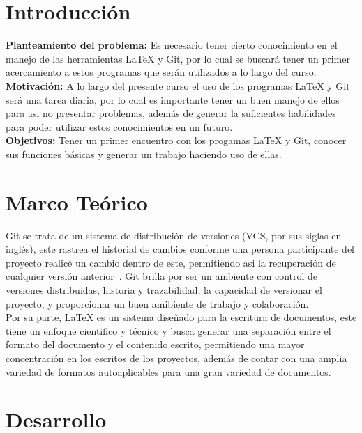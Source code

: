 \documentclass[letterpaper,12pt,oneside]{article}
\begin{document}
\tableofcontents
\clearpage
    

\section{Introducción} 

    \textbf{Planteamiento del problema:} Es necesario tener cierto conocimiento en el manejo de las herramientas LaTeX y Git, por lo cual se buscará tener un primer acercamiento a estos programas que serán utilizados a lo largo del curso.\\
    
    \textbf{Motivación:} A lo largo del presente curso el uso de los programas LaTeX y Git será una tarea diaria, por lo cual es importante tener un buen manejo de ellos para asi no presentar problemas, además de generar la suficientes habilidades para poder utilizar estos conocimientos en un futuro. \\
    
    \textbf{Objetivos:} Tener un primer encuentro con los progamas LaTeX y Git, conocer sus funciones básicas y generar un trabajo haciendo uso de ellas. 

\section{Marco Teórico}

Git se trata de un sistema de distribución de versiones (VCS, por sus siglas en inglés), este rastrea el historial de cambios conforme una persona participante del proyecto realicé un cambio dentro de este, permitiendo asi la recuperación de cualquier versión anterior~\cite{git}. Git brilla por ser un ambiente con control de versiones distribuidas, historia y trazabilidad, la capacidad de versionar el proyecto, y proporcionar un buen amibiente de trabajo y colaboración.\\

Por su parte, LaTeX es un sistema diseñado para la escritura de documentos, este tiene un enfoque cientifico y técnico y busca generar una separación entre el formato del documento y el contenido escrito, permitiendo una mayor concentración en los escritos de los proyectos, además de contar con una amplia variedad de formatos autoaplicables para una gran variedad de documentos.~\cite{Latex}

\section{Desarrollo}
\end{document}
